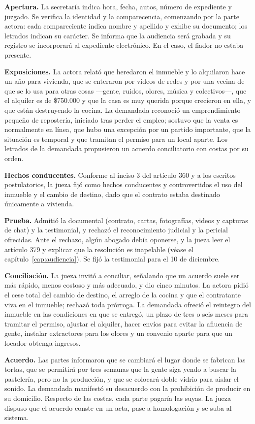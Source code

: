 \documentclass[12pt,oneside]{book}
\begin{document}
\textbf{Apertura.} La secretaría indica hora, fecha, autos, número de expediente y juzgado. Se verifica la identidad y la comparecencia, comenzando por la parte actora: cada compareciente indica nombre y apellido y exhibe su documento; los letrados indican su carácter. Se informa que la audiencia será grabada y su registro se incorporará al expediente electrónico. En el caso, el fiador no estaba presente.

\textbf{Exposiciones.} La actora relató que heredaron el inmueble y lo alquilaron hace un año para vivienda, que se enteraron por videos de redes y por una vecina de que se lo usa para otras cosas ---gente, ruidos, olores, música y colectivos---, que el alquiler es de \$750.000 y que la casa es muy querida porque crecieron en ella, y que están destruyendo la cocina. La demandada reconoció un emprendimiento pequeño de repostería, iniciado tras perder el empleo; sostuvo que la venta es normalmente en línea, que hubo una excepción por un partido importante, que la situación es temporal y que tramitan el permiso para un local aparte. Los letrados de la demandada propusieron un acuerdo conciliatorio con costas por su orden.

\textbf{Hechos conducentes.} Conforme al inciso 3 del artículo 360 y a los escritos postulatorios, la jueza fijó como hechos conducentes y controvertidos el uso del inmueble y el cambio de destino, dado que el contrato estaba destinado únicamente a vivienda.

\textbf{Prueba.} Admitió la documental (contrato, cartas, fotografías, videos y capturas de chat) y la testimonial, y rechazó el reconocimiento judicial y la pericial ofrecidas. Ante el rechazo, algún abogado debía oponerse, y la jueza leer el artículo 379 y explicar que la resolución es inapelable (véase el capítulo~\ref{cap:audiencia}). Se fijó la testimonial para el 10 de diciembre.

\textbf{Conciliación.} La jueza invitó a conciliar, señalando que un acuerdo suele ser más rápido, menos costoso y más adecuado, y dio cinco minutos. La actora pidió el cese total del cambio de destino, el arreglo de la cocina y que el contratante viva en el inmueble; rechazó toda prórroga. La demandada ofreció el reintegro del inmueble en las condiciones en que se entregó, un plazo de tres o seis meses para tramitar el permiso, ajustar el alquiler, hacer envíos para evitar la afluencia de gente, instalar extractores para los olores y un convenio aparte para que un locador obtenga ingresos.

\textbf{Acuerdo.} Las partes informaron que se cambiará el lugar donde se fabrican las tortas, que se permitirá por tres semanas que la gente siga yendo a buscar la pastelería, pero no la producción, y que se colocará doble vidrio para aislar el sonido. La demandada manifestó su desacuerdo con la prohibición de producir en su domicilio. Respecto de las costas, cada parte pagaría las suyas. La jueza dispuso que el acuerdo conste en un acta, pase a homologación y se suba al sistema.
\end{document}
